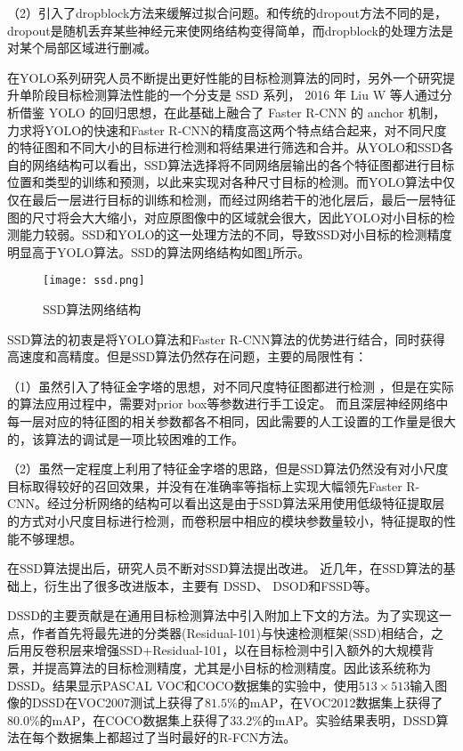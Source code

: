 （2）引入了dropblock方法\cite{ghiasi2018dropblock}来缓解过拟合问题。和传统的dropout方法不同的是，dropout是随机丢弃某些神经元来使网络结构变得简单，而dropblock的处理方法是对某个局部区域进行删减。

在YOLO系列研究人员不断提出更好性能的目标检测算法的同时，另外一个研究提升单阶段目标检测算法性能的一个分支是 SSD 系列， 2016 年 Liu W 等人通过分析借鉴 YOLO 的回归思想，在此基础上融合了 Faster R-CNN 的 anchor 机制，力求将YOLO的快速和Faster R-CNN的精度高这两个特点结合起来，对不同尺度的特征图和不同大小的目标进行检测和将结果进行筛选和合并。从YOLO和SSD各自的网络结构可以看出，SSD算法选择将不同网络层输出的各个特征图都进行目标位置和类型的训练和预测，以此来实现对各种尺寸目标的检测。而YOLO算法中仅仅在最后一层进行目标的训练和检测，而经过网络若干的池化层后，最后一层特征图的尺寸将会大大缩小，对应原图像中的区域就会很大，因此YOLO对小目标的检测能力较弱。SSD和YOLO的这一处理方法的不同，导致SSD对小目标的检测精度明显高于YOLO算法。SSD的算法网络结构如图\ref{ssd}所示。

\begin{figure}[htbp]
    \centering
    \texttt{[image: ssd.png]}
    \caption{SSD算法网络结构}
    \label{ssd}
\end{figure}

SSD算法的初衷是将YOLO算法和Faster R-CNN算法的优势进行结合，同时获得高速度和高精度。但是SSD算法仍然存在问题，主要的局限性有：

（1）虽然引入了特征金字塔的思想，对不同尺度特征图都进行检测
，但是在实际的算法应用过程中，需要对prior box等参数进行手工设定。
而且深层神经网络中每一层对应的特征图的相关参数都各不相同，因此需要的人工设置的工作量是很大的，该算法的调试是一项比较困难的工作。

（2）虽然一定程度上利用了特征金字塔的思路，但是SSD算法仍然没有对小尺度目标取得较好的召回效果，并没有在准确率等指标上实现大幅领先Faster R-CNN。经过分析网络的结构可以看出这是由于SSD算法采用使用低级特征提取层的方式对小尺度目标进行检测，而卷积层中相应的模块参数量较小，特征提取的性能不够理想。

在SSD算法提出后，研究人员不断对SSD算法提出改进。
近几年，在SSD算法的基础上，衍生出了很多改进版本，主要有 DSSD\cite{fu2017dssd}、
DSOD\cite{shen2017dsod}和FSSD\cite{li2017fssd}等。

DSSD的主要贡献是在通用目标检测算法中引入附加上下文的方法。为了实现这一点，作者首先将最先进的分类器(Residual-101)与快速检测框架(SSD)相结合，之后用反卷积层来增强SSD+Residual-101，以在目标检测中引入额外的大规模背景，并提高算法的目标检测精度，尤其是小目标的检测精度。因此该系统称为DSSD。结果显示PASCAL VOC和COCO数据集的实验中，使用$513 \times513$输入图像的DSSD在VOC2007测试上获得了$81.5\%$的mAP，在VOC2012数据集上获得了$80.0\%$的mAP，在COCO数据集上获得了$33.2\%$的mAP。实验结果表明，DSSD算法在每个数据集上都超过了当时最好的R-FCN方法。


